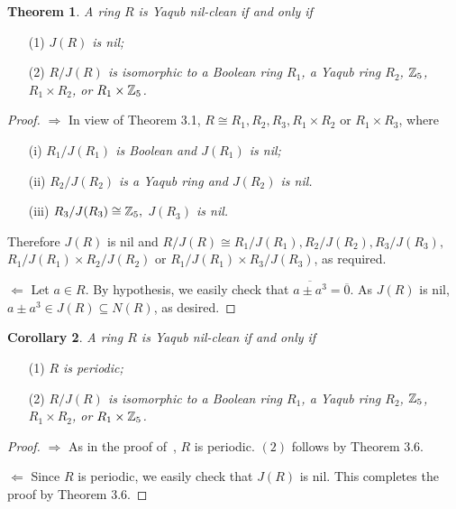\documentclass[12pt, reqno]{amsart}
\newtheorem{thm}{Theorem}[section]
\newtheorem{cor}[thm]{Corollary}
\numberwithin{equation}{section}
\begin{document}
\begin{thm} A ring $R$ is Yaqub nil-clean if and only if
\end{thm}
\begin{enumerate}
\item [(1)] {\it $J(R)$ is nil;}
\vspace{-.5mm}
\item [(2)] {\it $R/J(R)$ is isomorphic to a Boolean ring $R_1$, a Yaqub ring $R_2$, ${\Bbb Z}_5$, $R_1\times R_2$, or $R_1\times {\Bbb Z}_5$.}
\end{enumerate}
\begin{proof} $\Longrightarrow $ In view of Theorem 3.1, $R\cong R_1, R_2,R_3, R_1\times R_2$ or $R_1\times R_3$, where
\begin{enumerate}
\item [(i)] {\it $R_1/J(R_1)$ is Boolean and $J(R_1)$ is nil;}
\vspace{-.5mm}
\item [(ii)] {\it $R_2/J(R_2)$ is a Yaqub ring and $J(R_2)$ is nil.}
\vspace{-.5mm}
\item [(iii)] {\it $R_3/J(R_3)\cong {\Bbb Z}_5,$ $J(R_3)$ is nil.}
\end{enumerate} Therefore $J(R)$ is nil and $R/J(R)\cong R_1/J(R_1), R_2/J(R_2), R_3/J(R_3),$ $R_1/J(R_1)\times R_2/J(R_2)$ or $R_1/J(R_1)\times R_3/J(R_3)$, as required.

$\Longleftarrow$ Let $a\in R$. By hypothesis, we easily check that $\overline{a\pm a^3}=\overline{0}$. As $J(R)$ is nil, $a\pm a^3\in J(R)\subseteq N(R)$, as desired.\end{proof}

\begin{cor} A ring $R$ is Yaqub nil-clean if and only if\end{cor}
\begin{enumerate}
\item [(1)]{\it $R$ is periodic;}
\vspace{-.5mm}
\item [(2)]{\it $R/J(R)$ is isomorphic to a Boolean ring $R_1$, a Yaqub ring $R_2$, ${\Bbb Z}_5$, $R_1\times R_2$, or $R_1\times {\Bbb Z}_5$.}
\end{enumerate}
\begin{proof} $\Longrightarrow$ As in the proof of~\cite[Proposition 3.5]{CS}, $R$ is periodic. $(2)$ follows by Theorem 3.6.

$\Longleftarrow$ Since $R$ is periodic, we easily check that $J(R)$ is nil. This completes the proof by Theorem 3.6.\end{proof}
\end{document}
